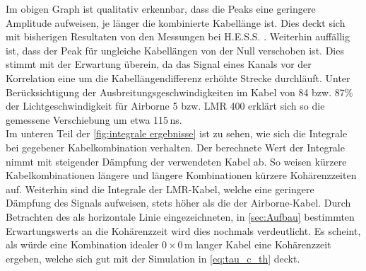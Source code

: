 Im obigen Graph ist qualitativ erkennbar, dass die Peaks eine geringere Amplitude aufweisen, je länger die kombinierte Kabellänge ist. 
Dies deckt sich mit bisherigen Resultaten von den Messungen bei H.E.S.S. \cite{zmijaFirstIntensityInterferometry2023}. 
Weiterhin auffällig ist, dass der Peak für ungleiche Kabellängen von der Null verschoben ist. 
Dies stimmt mit der Erwartung überein, da das Signal eines Kanals vor der Korrelation eine um die Kabellängendifferenz erhöhte Strecke durchläuft. 
Unter Berücksichtigung der Ausbreitungsgeschwindigkeiten im Kabel von 84 bzw. 87\% der Lichtgeschwindigkeit für Airborne 5 bzw. LMR 400 \cite{s.r.lAirborne10Coaxial,LMR400CoaxCable} erklärt sich so die gemessene Verschiebung um etwa 115\,ns. \\
Im unteren Teil der \autoref{fig:integrale ergebnisse} ist zu sehen, wie sich die Integrale bei gegebener Kabelkombination verhalten. 
Der berechnete Wert der Integrale nimmt mit steigender Dämpfung der verwendeten Kabel ab. 
So weisen kürzere Kabelkombinationen längere und längere Kombinationen kürzere Kohärenzzeiten auf. 
Weiterhin sind die Integrale der LMR-Kabel, welche eine geringere Dämpfung des Signals aufweisen, stets höher als die der Airborne-Kabel. 
Durch Betrachten des als horizontale Linie eingezeichneten, in \autoref{sec:Aufbau} bestimmten Erwartungswerts an die Kohärenzzeit wird dies nochmals verdeutlicht. 
Es scheint, als würde eine Kombination idealer $0\times 0\,\mathrm{m}$ langer Kabel eine Kohärenzzeit ergeben, welche sich gut mit der Simulation in \autoref{eq:tau_c_th} deckt. \\

